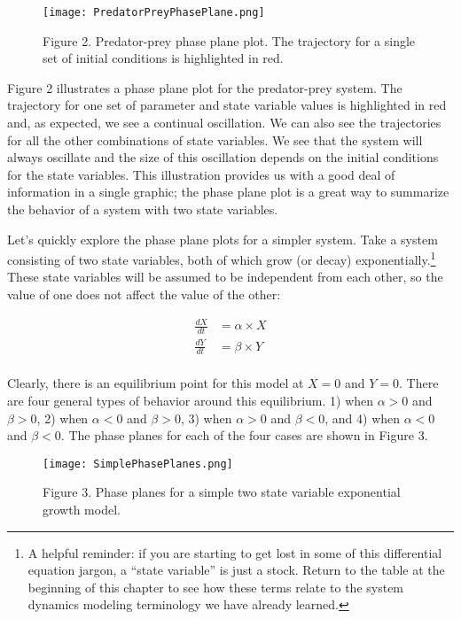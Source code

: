\documentclass[]{memoir}
\let\Oldincludegraphics\includegraphics
\renewcommand{\includegraphics}[1]{\Oldincludegraphics[max size={\textwidth}{\textheight}]{#1}}
\begin{document}
\begin{figure}[htbp]
\centering
\texttt{[image: PredatorPreyPhasePlane.png]}
\caption{Figure 2. Predator-prey phase plane plot. The trajectory for a
single set of initial conditions is highlighted in red.}
\end{figure}

Figure 2 illustrates a phase plane plot for the predator-prey system.
The trajectory for one set of parameter and state variable values is
highlighted in red and, as expected, we see a continual oscillation. We
can also see the trajectories for all the other combinations of state
variables. We see that the system will always oscillate and the size of
this oscillation depends on the initial conditions for the state
variables. This illustration provides us with a good deal of information
in a single graphic; the phase plane plot is a great way to summarize
the behavior of a system with two state variables.

Let's quickly explore the phase plane plots for a simpler system. Take a
system consisting of two state variables, both of which grow (or decay)
exponentially.\footnote{A helpful reminder: if you are starting to get
  lost in some of this differential equation jargon, a ``state
  variable'' is just a stock. Return to the table at the beginning of
  this chapter to see how these terms relate to the system dynamics
  modeling terminology we have already learned.} These state variables
will be assumed to be independent from each other, so the value of one
does not affect the value of the other:

\[
\begin{aligned}
\frac{dX}{dt} &= \alpha \times X \\
\frac{dY}{dt} &= \beta \times Y \\
\end{aligned}
\]

Clearly, there is an equilibrium point for this model at $X=0$ and
$Y=0$. There are four general types of behavior around this equilibrium.
1) when $\alpha>0$ and $\beta>0$, 2) when $\alpha<0$ and $\beta>0$, 3)
when $\alpha>0$ and $\beta<0$, and 4) when $\alpha<0$ and $\beta<0$. The
phase planes for each of the four cases are shown in Figure 3.

\begin{figure}[htbp]
\centering
\texttt{[image: SimplePhasePlanes.png]}
\caption{Figure 3. Phase planes for a simple two state variable
exponential growth model.}
\end{figure}
\end{document}
